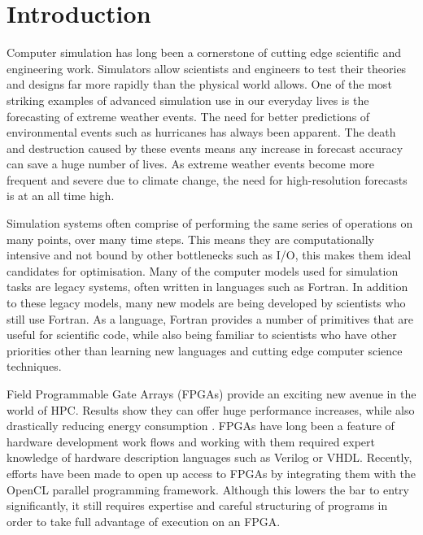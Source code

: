 \documentclass{mpaper}
\begin{document}
\section{Introduction}

Computer simulation has long been a cornerstone of cutting edge scientific and engineering work. Simulators allow scientists and engineers to test their theories and designs far more rapidly than the physical world allows.
One of the most striking examples of advanced simulation use in our everyday lives is the forecasting of extreme weather events.
The need for better predictions of environmental events such as hurricanes has always been apparent.
The death and destruction caused by these events means any increase in forecast accuracy can save a huge number of lives.
As extreme weather events become more frequent and severe due to climate change, the need for high-resolution forecasts is at an all time high.

Simulation systems often comprise of performing the same series of operations on many points, over many time steps.
This means they are computationally intensive and not bound by other bottlenecks such as I/O, this makes them ideal candidates for optimisation.
Many of the computer models used for simulation tasks are legacy systems, often written in languages such as Fortran.
In addition to these legacy models, many new models are being developed by scientists who still use Fortran.
As a language, Fortran provides a number of primitives that are useful for scientific code, while also being familiar to scientists who have other priorities other than learning new languages and cutting edge computer science techniques.

Field Programmable Gate Arrays (FPGAs) provide an exciting new avenue in the world of HPC.
Results show they can offer huge performance increases, while also drastically reducing energy consumption \cite{Vanderbauwhede2014,Prasanna2006,Dimond2011}.
FPGAs have long been a feature of hardware development work flows and working with them required expert knowledge of hardware description languages such as Verilog or VHDL.
Recently, efforts have been made to open up access to FPGAs by integrating them with the OpenCL parallel programming framework.
Although this lowers the bar to entry significantly, it still requires expertise and careful structuring of programs in order to take full advantage of execution on an FPGA.
\end{document}
